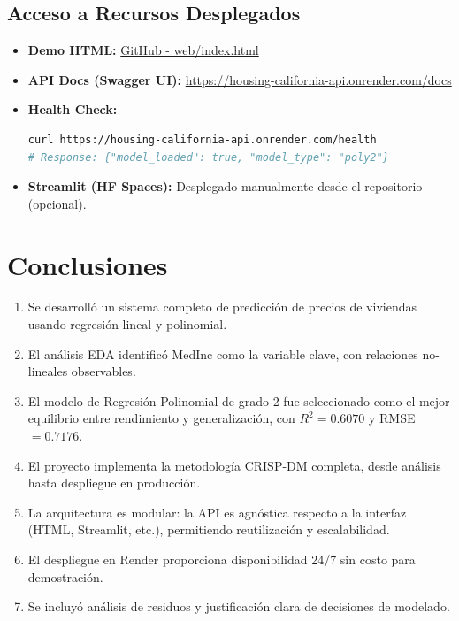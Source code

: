\documentclass[11pt,a4paper]{article}
\begin{document}
\subsection{Acceso a Recursos Desplegados}

\begin{itemize}
  \item \textbf{Demo HTML:} 
    \href{https://github.com/Honorio-Morales/housingCalifornia/blob/main/web/index.html}{GitHub - web/index.html}
    
  \item \textbf{API Docs (Swagger UI):} 
    \href{https://housing-california-api.onrender.com/docs}{https://housing-california-api.onrender.com/docs}
    
  \item \textbf{Health Check:}
    \begin{lstlisting}[language=bash]
curl https://housing-california-api.onrender.com/health
# Response: {"model_loaded": true, "model_type": "poly2"}
    \end{lstlisting}
    
  \item \textbf{Streamlit (HF Spaces):} Desplegado manualmente desde el repositorio (opcional).
\end{itemize}

\section{Conclusiones}

\begin{enumerate}
  \item Se desarrolló un sistema completo de predicción de precios de viviendas usando regresión lineal y polinomial.
  
  \item El análisis EDA identificó MedInc como la variable clave, con relaciones no-lineales observables.
  
  \item El modelo de Regresión Polinomial de grado 2 fue seleccionado como el mejor equilibrio entre rendimiento y generalización, 
    con $R^2 = 0.6070$ y RMSE $= 0.7176$.
  
  \item El proyecto implementa la metodología CRISP-DM completa, desde análisis hasta despliegue en producción.
  
  \item La arquitectura es modular: la API es agnóstica respecto a la interfaz (HTML, Streamlit, etc.), 
    permitiendo reutilización y escalabilidad.
  
  \item El despliegue en Render proporciona disponibilidad 24/7 sin costo para demostración.
  
  \item Se incluyó análisis de residuos y justificación clara de decisiones de modelado.
\end{enumerate}
\end{document}
